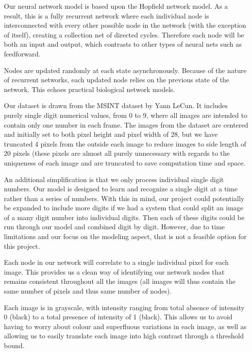 \documentclass[]{article}
\begin{document}
\hfill \break
Our neural network model is based upon the Hopfield network model.  As a result, this is a fully recurrent network where each individual node is interconnected with every other possible node in the network (with the exception of itself), creating a collection net of directed cycles.  Therefore each node will be both an input and output, which contrasts to other types of neural nets such as feedforward.

\hfill \break
Nodes are updated randomly at each state asynchronously.  Because of the nature of recurrent networks, each updated node relies on the previous state of the network.  This echoes practical biological network models.

\hfill \break
	Our dataset is drawn from the MSINT dataset by Yann LeCun.
It includes purely single digit numerical values, from 0 to 9, where all images are intended to contain only one number in each frame.  The images from the dataset are centered and initially set to both pixel height and pixel width of 28, but we have truncated 4 pixels from the outside each image to reduce images to side length of 20 pixels (these pixels are almost all purely unnecessary with regards to the uniqueness of each image and are truncated to save computation time and space.

\hfill \break
	An additional simplification is that we only process individual single digit numbers.  Our model is designed to learn and recognize a single digit at a time rather than a series of numbers.  With this in mind, our project could potentially be expanded to include more digits if we had a system that could split an image of a many digit number into individual digits.  Then each of these digits could be run through our model and combined digit by digit.  However, due to time limitations and our focus on the modeling aspect, that is not a feasible option for this project.
	
\hfill \break
Each node in our network will correlate to a single individual pixel for each image.  This provides us a clean way of identifying our network nodes that remains consistent throughout all the images (all images will thus contain the same number of pixels and thus same number of nodes).

\hfill \break
Each image is in grayscale, with intensity ranging from total absence of intensity 0 (black) to a total presence of intensity of 1 (black).  This allows us to avoid having to worry about colour and superfluous variations in each image, as well as allowing us to easily translate each image into high contrast through a threshold bound.
\end{document}

